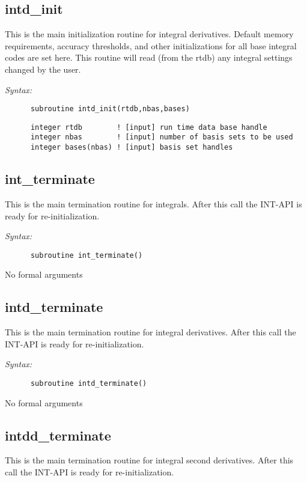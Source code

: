 \subsection{intd\_init} 
This is the main initialization routine for integral derivatives. 
Default memory requirements, accuracy thresholds, and other  
initializations for all base integral codes are set here.  
This routine will read (from the rtdb) any integral  
settings changed by the user. 
 
{\it Syntax:} 
\begin{verbatim} 
      subroutine intd_init(rtdb,nbas,bases) 
\end{verbatim} 
\begin{verbatim} 
      integer rtdb        ! [input] run time data base handle 
      integer nbas        ! [input] number of basis sets to be used 
      integer bases(nbas) ! [input] basis set handles 
\end{verbatim} 
 
\subsection{int\_terminate} 
This is the main termination routine for integrals. 
After this call the INT-API is ready for re-initialization. 
 
{\it Syntax:} 
\begin{verbatim} 
      subroutine int_terminate() 
\end{verbatim} 
No formal arguments 
 
 
\subsection{intd\_terminate} 
This is the main termination routine for integral 
derivatives. 
After this call the INT-API is ready for re-initialization. 
 
{\it Syntax:} 
\begin{verbatim} 
      subroutine intd_terminate() 
\end{verbatim} 
No formal arguments 
 
 
\subsection{intdd\_terminate} 
This is the main termination routine for integral 
second derivatives. 
After this call the INT-API is ready for re-initialization. 
 
